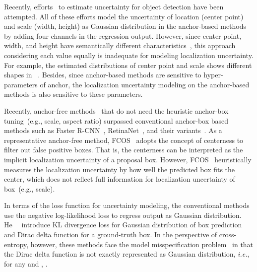 \documentclass[final]{cvpr}
\begin{document}
Recently, efforts~\cite{kraus2019uncertainty,he2019bounding,le2018uncertainty,harakeh2019bayesod} to estimate uncertainty for object detection have been attempted.
All of these efforts model the uncertainty of location (center point) and scale (width, height) as Gaussian distribution in the anchor-based methods by adding four channels in the regression output.
However, since center point, width, and height have semantically different characteristics~\cite{kraus2019uncertainty}, this approach considering each value equally is inadequate for modeling localization uncertainty.
For example, the estimated distributions of center point and scale shows different shapes in ~\cite{kraus2019uncertainty}.
Besides, since anchor-based methods are sensitive to hyper-parameters of anchor, the localization uncertainty modeling on the anchor-based methods is also sensitive to these parameters.



Recently, anchor-free methods~\cite{law2018cornernet,Duan_2019_ICCV,zhou2019bottom,zhou2019objects,Tian_2019_ICCV} that do not need the heuristic anchor-box tuning~(e.g., scale, aspect ratio) surpassed conventional anchor-box based methods such as Faster R-CNN~\cite{ren2015faster}, RetinaNet~\cite{lin2018focal}, and their variants~\cite{cai2018cascade,zhang2018single}.
As a representative anchor-free method, FCOS~\cite{Tian_2019_ICCV} adopts the concept of centerness to filter out false positive boxes.
That is, the centerness can be interpreted as the implicit localization uncertainty of a proposal box.
However, FCOS~\cite{Tian_2019_ICCV} heuristically measures the localization uncertainty by how well the predicted box fits the center, which does not reflect full information for localization uncertainty of box~(e.g., scale).


In terms of the loss function for uncertainty modeling, the conventional methods~\cite{kraus2019uncertainty,le2018uncertainty,harakeh2019bayesod} use the negative log-likelihood loss to regress output as Gaussian distribution.
He~\etal~\cite{he2019bounding} introduce KL divergence loss for Gaussian distribution of box prediction and Dirac delta function for a ground-truth box.
In the perspective of cross-entropy, however, these methods face the model misspecification problem~\cite{holmes2017assigning} in that the Dirac delta function is not exactly represented as Gaussian distribution, \textit{i.e.}, for any  and , .
\end{document}
